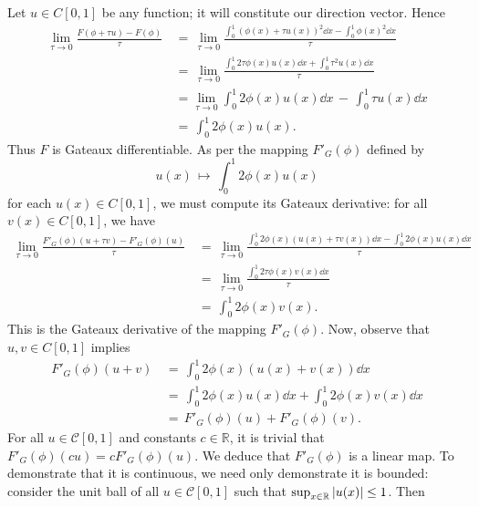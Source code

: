 \documentclass[11pt]{article}
\begin{document}
Let $u \in C[0, 1]$ be any function; it will constitute our direction vector. Hence
\begin{align*}
  \lim\limits_{\tau \to 0} \frac{F(\phi + \tau u) - F(\phi)}{\tau} \, &= \, \lim\limits_{\tau \to 0} \frac{\int_{0}^{1} (\phi(x) + \tau u(x))^{2} \dd{x} - \int_{0}^{1} \phi(x)^{2} \dd{x}}{\tau} \\
                                                                      &= \, \lim\limits_{\tau \to 0} \frac{\int_{0}^{1} 2 \tau \phi(x) u(x) \dd{x} + \int_{0}^{1} \tau^{2} u(x) \dd{x}}{\tau} \\
                                                                      &= \lim\limits_{\tau \to 0} \int_{0}^{1} 2 \phi(x) u(x) \dd{x} \, - \, \int_{0}^{1} \tau u(x) \dd{x} \\
                                                                      &= \, \int_{0}^{1} 2 \phi(x) u(x).
\end{align*}
Thus $F$ is Gateaux differentiable. As per the mapping $F'_{G}(\phi)$ defined by
\[
  u(x)\, \mapsto \, \int_{0}^{1} 2\phi(x) u(x)
\]
for each $u(x) \in C[0, 1]$, we must compute its Gateaux derivative: for all $v(x) \in C[0, 1]$, we have
\begin{align*}
  \lim\limits_{\tau \to 0} \frac{F'_{G}(\phi)(u + \tau v) - F'_{G}(\phi)(u)}{\tau} \, &= \, \lim\limits_{\tau \to 0} \frac{\int_{0}^{1} 2 \phi(x) (u(x) + \tau v(x)) \dd{x} - \int_{0}^{1} 2 \phi(x) u(x) \dd{x}}{\tau} \\
                                                                                      &= \, \lim\limits_{\tau \to 0} \frac{\int_{0}^{1} 2 \tau \phi(x) v(x) \dd{x}}{\tau} \\
                                                                                      & = \, \int_{0}^{1} 2 \phi(x) v(x).
\end{align*}
This is the Gateaux derivative of the mapping $F'_{G}(\phi)$. Now, observe that $u, v \in C[0, 1]$ implies
\begin{align*}
  F'_{G}(\phi)(u + v) \, &= \, \int_{0}^{1} 2 \phi(x)(u(x) + v(x)) \dd{x} \\ 
                         &= \, \int_{0}^{1} 2 \phi(x)u(x) \dd{x} + \int_{0}^{1} 2 \phi(x)v(x) \dd{x} \\
                         &= \, F'_{G}(\phi)(u) + F'_{G}(\phi)(v).
\end{align*}
For all $u \in \mathcal{C}[0, 1]$ and constants $c \in \mathbb{R}$, it is trivial that $F'_{G}(\phi)(cu) = c F'_{G}(\phi)(u)$. We deduce that $F'_{G}(\phi)$ is a linear map. To demonstrate that it is continuous, we need only demonstrate it is bounded: consider the unit ball of all $u \in \mathcal{C}[0, 1]$ such that $\sup_{x \in \mathbb{R}} \abs{u(x)} \le 1$. Then
\end{document}

